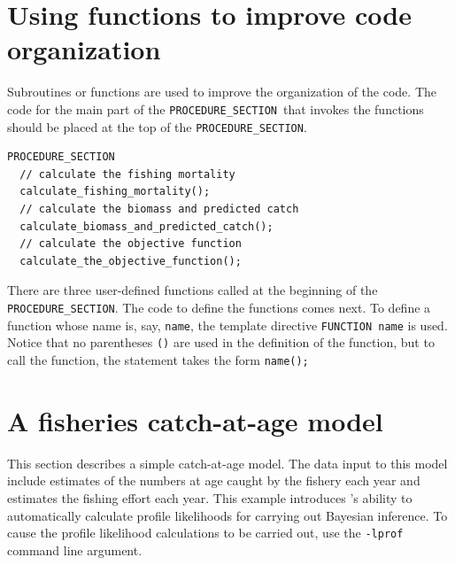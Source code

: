 \documentclass{admbmanual}
\newcommand\PROS{\texttt{PROCEDURE\_SECTION}}
\begin{document}
\section{Using functions to improve code organization}

Subroutines or functions are used to improve the organization of the code. 
The code for the main part of the
\PROS\ that invokes the functions should be placed at the 
top of the \PROS. 
\begin{lstlisting}
PROCEDURE_SECTION
  // calculate the fishing mortality
  calculate_fishing_mortality();
  // calculate the biomass and predicted catch
  calculate_biomass_and_predicted_catch();
  // calculate the objective function
  calculate_the_objective_function();
\end{lstlisting}
There are three user-defined functions called at the beginning of the
\texttt{PROCEDURE\_SECTION}.
The code to define the functions comes next.
To define a function whose name is, say, \texttt{name}, the template directive 
\texttt{FUNCTION name} is used. Notice that no parentheses \texttt{()} 
are used in the
definition of the function, but to call the function, the 
statement takes the form \mbox{\texttt{name();}}

{} 


\section{A fisheries catch-at-age model}

This section describes a simple catch-at-age model. The data input to this
model include estimates of the numbers at age caught by the fishery 
each year and estimates the fishing effort each year. This example introduces
\ADM's ability to automatically calculate profile likelihoods
for carrying out Bayesian inference. To cause the profile likelihood calculations
to be carried out, use the \texttt{-lprof} command line argument.
\end{document}

